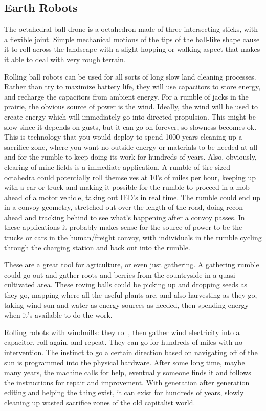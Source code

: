 \subsection{Earth Robots}\label{earth-robots}

The octahedral ball drone is a octahedron made of three intersecting
sticks, with a flexible joint. Simple mechanical motions of the tips of
the ball-like shape cause it to roll across the landscape with a slight
hopping or walking aspect that makes it able to deal with very rough
terrain.

Rolling ball robots can be used for all sorts of long slow land cleaning
processes. Rather than try to maximize battery life, they will use
capacitors to store energy, and recharge the capacitors from ambient
energy. For a rumble of jacks in the prairie, the obvious source of
power is the wind. Ideally, the wind will be used to create energy which
will immediately go into directed propulsion. This might be slow since
it depends on gusts, but it can go on forever, so slowness becomes ok.
This is technology that you would deploy to spend 1000 years cleaning up
a sacrifice zone, where you want no outside energy or materials to be
needed at all and for the rumble to keep doing its work for hundreds of
years. Also, obviously, clearing of mine fields is a immediate
application. A rumble of tire-sized octahedra could potentially roll
themselves at 10's of miles per hour, keeping up with a car or truck and
making it possible for the rumble to proceed in a mob ahead of a motor
vehicle, taking out IED's in real time. The rumble could end up in a
convoy geometry, stretched out over the length of the road, doing recon
ahead and tracking behind to see what's happening after a convoy passes.
In these applications it probably makes sense for the source of power to
be the trucks or cars in the human/freight convoy, with individuals in
the rumble cycling through the charging station and back out into the
rumble.

These are a great tool for agriculture, or even just gathering. A
gathering rumble could go out and gather roots and berries from the
countryside in a quasi-cultivated area. These roving balls could be
picking up and dropping seeds as they go, mapping where all the useful
plants are, and also harvesting as they go, taking wind sun and water as
energy sources as needed, then spending energy when it's available to do
the work.

Rolling robots with windmills: they roll, then gather wind electricity
into a capacitor, roll again, and repeat. They can go for hundreds of
miles with no intervention. The instinct to go a certain direction based
on navigating off of the sun is programmed into the physical hardware.
After some long time, maybe many years, the machine calls for help,
eventually someone finds it and follows the instructions for repair and
improvement. With generation after generation editing and helping the
thing exist, it can exist for hundreds of years, slowly cleaning up
wasted sacrifice zones of the old capitalist world.

